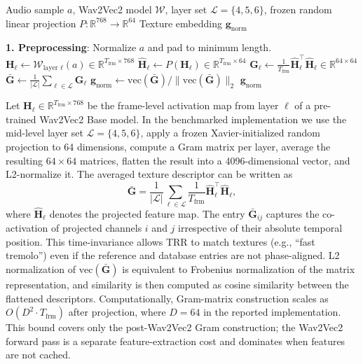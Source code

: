 \begin{algorithm}[ht]
		\caption{TRR Encoding}
		\label{alg:trr_encoding}
		\begin{algorithmic}
			\REQUIRE Audio sample $a$, Wav2Vec2 model $\mathcal{W}$, layer set $\mathcal{L}=\{4,5,6\}$, frozen random linear projection $P:\mathbb{R}^{768}\rightarrow\mathbb{R}^{64}$
			\ENSURE Texture embedding $\mathbf{g}_{\text{norm}}$

			\STATE \textbf{1. Preprocessing}: Normalize $a$ and pad to minimum length.
			\STATE $\mathbf{H}_{\ell} \leftarrow \mathcal{W}_{\text{layer }\ell}(a) \in \mathbb{R}^{T_{\text{frm}} \times 768}$
			\STATE $\widehat{\mathbf{H}}_{\ell} \leftarrow P(\mathbf{H}_{\ell}) \in \mathbb{R}^{T_{\text{frm}} \times 64}$ 
			\STATE $\mathbf{G}_{\ell} \leftarrow \frac{1}{T_{\text{frm}}}\widehat{\mathbf{H}}_{\ell}^{\top}\widehat{\mathbf{H}}_{\ell} \in \mathbb{R}^{64 \times 64}$
			\ENDFOR
			\STATE $\bar{\mathbf{G}} \leftarrow \frac{1}{|\mathcal{L}|}\sum_{\ell\in\mathcal{L}}\mathbf{G}_{\ell}$
			\STATE $\mathbf{g}_{\text{norm}} \leftarrow \mathrm{vec}(\bar{\mathbf{G}}) / \|\mathrm{vec}(\bar{\mathbf{G}})\|_2$
		\RETURN $\mathbf{g}_{\text{norm}}$
	\end{algorithmic}
\end{algorithm}

Let $\mathbf{H}_{\ell} \in \mathbb{R}^{T_{\text{frm}} \times 768}$ be the frame-level activation map from layer $\ell$ of a pre-trained Wav2Vec2 Base model. In the benchmarked implementation we use the mid-level layer set $\mathcal{L}=\{4,5,6\}$, apply a frozen Xavier-initialized random projection to 64 dimensions, compute a Gram matrix per layer, average the resulting $64\times 64$ matrices, flatten the result into a 4096-dimensional vector, and L2-normalize it. The averaged texture descriptor can be written as
\begin{equation}
		\bar{\mathbf{G}} = \frac{1}{|\mathcal{L}|}\sum_{\ell\in\mathcal{L}} \frac{1}{T_{\text{frm}}}\widehat{\mathbf{H}}_{\ell}^{\top}\widehat{\mathbf{H}}_{\ell},
\end{equation}
where $\widehat{\mathbf{H}}_{\ell}$ denotes the projected feature map. The entry $\bar{\mathbf{G}}_{ij}$ captures the co-activation of projected channels $i$ and $j$ irrespective of their absolute temporal position. This time-invariance allows TRR to match textures (e.g., ``fast tremolo'') even if the reference and database entries are not phase-aligned. L2 normalization of $\mathrm{vec}(\bar{\mathbf{G}})$ is equivalent to Frobenius normalization of the matrix representation, and similarity is then computed as cosine similarity between the flattened descriptors. Computationally, Gram-matrix construction scales as $O(D^2 \cdot T_{\text{frm}})$ after projection, where $D=64$ in the reported implementation. This bound covers only the post-Wav2Vec2 Gram construction; the Wav2Vec2 forward pass is a separate feature-extraction cost and dominates when features are not cached.

